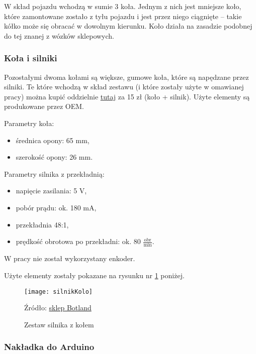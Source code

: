 \documentclass[11pt]{article}
\begin{document}
W skład pojazdu wchodzą w sumie 3 koła. Jednym z nich jest mniejsze koło, które zamontowane zostało z tyłu pojazdu i jest przez niego ciągnięte -- takie kółko może się obracać w dowolnym kierunku. Koło działa na zasadzie podobnej do tej znanej z wózków sklepowych.

\subsubsection*{Koła i silniki}

Pozostałymi dwoma kołami są większe, gumowe koła, które są napędzane przez silniki. Te które wchodzą w skład zestawu (i które zostały użyte w omawianej pracy) można kupić oddzielnie
\href{https://botland.com.pl/silniki-dc-katowe-z-przekladnia/16472-kolo-silnik-65x26mm-5v-z-przekladnia-481-przewody.html}{tutaj} za 15 zł (koło + silnik). Użyte elementy są produkowane przez OEM.

Parametry koła:
\begin{itemize}
\item średnica opony: 65 mm,
\item szerokość opony: 26 mm.
\end{itemize}

Parametry silnika z przekładnią:
\begin{itemize}
\item napięcie zasilania: 5 V,
\item pobór prądu: ok. 180 mA,
\item przekładnia 48:1,
\item prędkość obrotowa po przekładni: ok. 80 $\frac{\text{obr}}{\text{min}}$.
\end{itemize}

W pracy nie został wykorzystany enkoder.

Użyte elementy zostały pokazane na rysunku nr \ref{fig:silnikKolo} poniżej.

\begin{figure}[h!]
	\centering
	\texttt{[image: silnikKolo]}
	\caption{Zestaw silnika z kołem \label{fig:silnikKolo}}
	Źródło: \href{https://botland.com.pl/silniki-dc-katowe-z-przekladnia/16472-kolo-silnik-65x26mm-5v-z-przekladnia-481-przewody.html}{sklep Botland}
\end{figure}

\subsubsection*{Nakładka do Arduino}
\end{document}
